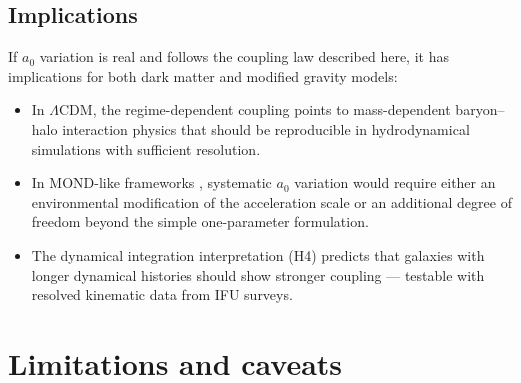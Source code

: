 \documentclass[fleqn,usenatbib]{mnras}
\newcommand{\azero}{a_0}
\begin{document}
\subsection{Implications}
\label{sec:implications}

If $\azero$ variation is real and follows the coupling law described here,
it has implications for both dark matter and modified gravity models:

\begin{itemize}
\item In $\Lambda$CDM, the regime-dependent coupling points to mass-dependent
  baryon--halo interaction physics \citep{DiCintio2014, Katz2017} that
  should be reproducible in hydrodynamical simulations with sufficient
  resolution.
\item In MOND-like frameworks \citep{Milgrom1983, Famaey2012}, systematic
  $\azero$ variation would require either an environmental modification of
  the acceleration scale or an additional degree of freedom beyond the
  simple one-parameter formulation.
\item The dynamical integration interpretation (H4) predicts that galaxies
  with longer dynamical histories should show stronger coupling ---
  testable with resolved kinematic data from IFU surveys.
\end{itemize}

\section{Limitations and caveats}
\label{sec:caveats}
\end{document}
